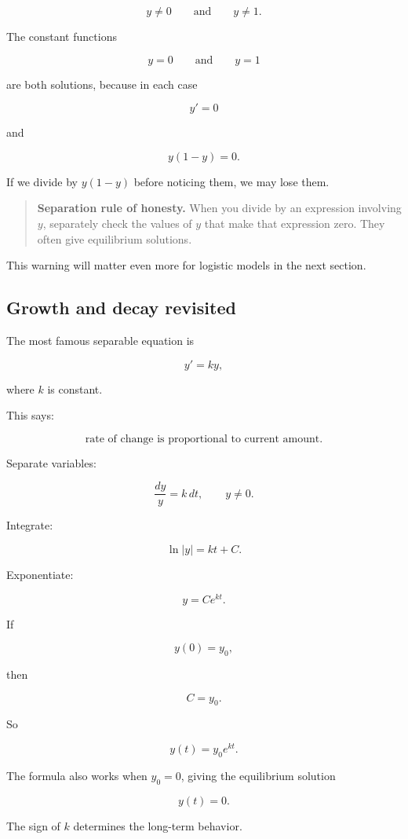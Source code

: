 \[
y\neq0
\qquad\text{and}\qquad
y\neq1.
\]

The constant functions

\[
y=0
\qquad\text{and}\qquad
y=1
\]

are both solutions, because in each case

\[
y'=0
\]

and

\[
y(1-y)=0.
\]

If we divide by \(y(1-y)\) before noticing them, we may lose them.

\begin{quote}
\textbf{Separation rule of honesty.}
When you divide by an expression involving \(y\), separately check the values of \(y\)
that make that expression zero.  They often give equilibrium solutions.
\end{quote}

This warning will matter even more for logistic models in the next section.

\subsection{Growth and decay revisited}
\label{subsec:growth-decay-revisited-separable}

The most famous separable equation is

\[
y'=ky,
\]

where \(k\) is constant.

This says:

\[
\text{rate of change is proportional to current amount}.
\]

Separate variables:

\[
\frac{dy}{y}=k\,dt,
\qquad y\neq0.
\]

Integrate:

\[
\ln|y|=kt+C.
\]

Exponentiate:

\[
y=Ce^{kt}.
\]

If

\[
y(0)=y_0,
\]

then

\[
C=y_0.
\]

So

\[
\boxed{
y(t)=y_0e^{kt}.
}
\]

The formula also works when \(y_0=0\), giving the equilibrium solution

\[
y(t)=0.
\]

The sign of \(k\) determines the long-term behavior.

